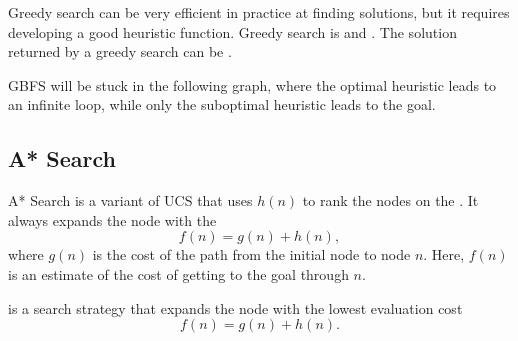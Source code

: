 Greedy search can be very efficient in practice at finding solutions, but it requires developing a good heuristic function. Greedy search is  and . The solution returned by a greedy search can be .

\begin{example}
    GBFS will be stuck in the following graph, where the optimal heuristic leads to an infinite loop, while only the suboptimal heuristic leads to the goal.

\end{example}

\subsection{A* Search}

A* Search is a variant of UCS that uses $h(n)$ to rank the nodes on the \Frontier. It always expands the node with the  \[ f(n) = g(n) + h(n), \] where $g(n)$ is the cost of the path from the initial node to node $n$. Here, $f(n)$ is an estimate of the cost of getting to the goal through $n$.

\begin{definition}[A* Search]\label{def:astar}
     is a search strategy that expands the node with the lowest evaluation cost \[ f(n) = g(n) + h(n). \]
\end{definition}

